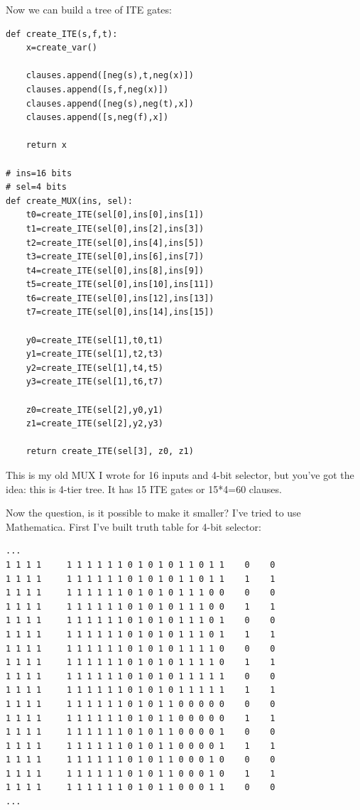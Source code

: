 Now we can build a tree of ITE gates:

\begin{lstlisting}
def create_ITE(s,f,t):
    x=create_var()

    clauses.append([neg(s),t,neg(x)])
    clauses.append([s,f,neg(x)])
    clauses.append([neg(s),neg(t),x])
    clauses.append([s,neg(f),x])

    return x

# ins=16 bits
# sel=4 bits
def create_MUX(ins, sel):
    t0=create_ITE(sel[0],ins[0],ins[1])
    t1=create_ITE(sel[0],ins[2],ins[3])
    t2=create_ITE(sel[0],ins[4],ins[5])
    t3=create_ITE(sel[0],ins[6],ins[7])
    t4=create_ITE(sel[0],ins[8],ins[9])
    t5=create_ITE(sel[0],ins[10],ins[11])
    t6=create_ITE(sel[0],ins[12],ins[13])
    t7=create_ITE(sel[0],ins[14],ins[15])

    y0=create_ITE(sel[1],t0,t1)
    y1=create_ITE(sel[1],t2,t3)
    y2=create_ITE(sel[1],t4,t5)
    y3=create_ITE(sel[1],t6,t7)

    z0=create_ITE(sel[2],y0,y1)
    z1=create_ITE(sel[2],y2,y3)

    return create_ITE(sel[3], z0, z1)
\end{lstlisting}

This is my old MUX I wrote for 16 inputs and 4-bit selector, but you've got the idea: this is 4-tier tree.
It has 15 ITE gates or 15*4=60 clauses.

Now the question, is it possible to make it smaller?
I've tried to use Mathematica.
First I've built truth table for 4-bit selector:

\begin{lstlisting}
...
1 1 1 1     1 1 1 1 1 1 0 1 0 1 0 1 1 0 1 1    0    0
1 1 1 1     1 1 1 1 1 1 0 1 0 1 0 1 1 0 1 1    1    1
1 1 1 1     1 1 1 1 1 1 0 1 0 1 0 1 1 1 0 0    0    0
1 1 1 1     1 1 1 1 1 1 0 1 0 1 0 1 1 1 0 0    1    1
1 1 1 1     1 1 1 1 1 1 0 1 0 1 0 1 1 1 0 1    0    0
1 1 1 1     1 1 1 1 1 1 0 1 0 1 0 1 1 1 0 1    1    1
1 1 1 1     1 1 1 1 1 1 0 1 0 1 0 1 1 1 1 0    0    0
1 1 1 1     1 1 1 1 1 1 0 1 0 1 0 1 1 1 1 0    1    1
1 1 1 1     1 1 1 1 1 1 0 1 0 1 0 1 1 1 1 1    0    0
1 1 1 1     1 1 1 1 1 1 0 1 0 1 0 1 1 1 1 1    1    1
1 1 1 1     1 1 1 1 1 1 0 1 0 1 1 0 0 0 0 0    0    0
1 1 1 1     1 1 1 1 1 1 0 1 0 1 1 0 0 0 0 0    1    1
1 1 1 1     1 1 1 1 1 1 0 1 0 1 1 0 0 0 0 1    0    0
1 1 1 1     1 1 1 1 1 1 0 1 0 1 1 0 0 0 0 1    1    1
1 1 1 1     1 1 1 1 1 1 0 1 0 1 1 0 0 0 1 0    0    0
1 1 1 1     1 1 1 1 1 1 0 1 0 1 1 0 0 0 1 0    1    1
1 1 1 1     1 1 1 1 1 1 0 1 0 1 1 0 0 0 1 1    0    0
...
\end{lstlisting}

